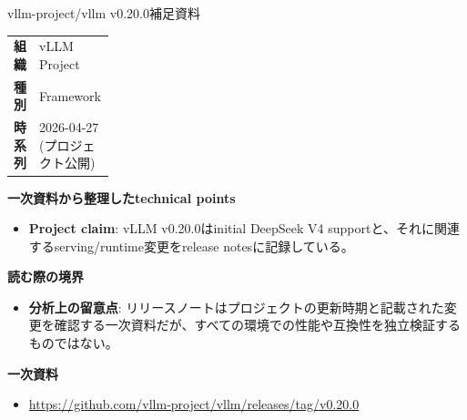 \begin{technicalnote}{vllm-project/vllm v0.20.0}{補足資料}
\begingroup
\begin{tabularx}{\linewidth}{@{}>{\bfseries}p{0.22\linewidth}X@{}}
組織 & vLLM Project \\
種別 & Framework \\
時系列 & 2026-04-27 (プロジェクト公開) \\
\end{tabularx}
\smallskip
{\bfseries 一次資料から整理したtechnical points}
\begin{itemize}[leftmargin=1.5em,itemsep=0.35em]
\item \textbf{Project claim}: vLLM v0.20.0はinitial DeepSeek V4 supportと、それに関連するserving/runtime変更をrelease notesに記録している。
\end{itemize}
{\bfseries 読む際の境界}
\begin{itemize}[leftmargin=1.5em,itemsep=0.35em]
\item \textbf{分析上の留意点}: リリースノートはプロジェクトの更新時期と記載された変更を確認する一次資料だが、すべての環境での性能や互換性を独立検証するものではない。
\end{itemize}
\begin{samepage}
{\bfseries 一次資料}
\begingroup\sloppy
\begin{itemize}[leftmargin=1.5em,itemsep=0.25em]
\item {\scriptsize\url{https://github.com/vllm-project/vllm/releases/tag/v0.20.0}}
\end{itemize}
\endgroup
\end{samepage}
\endgroup
\end{technicalnote}
\medskip
